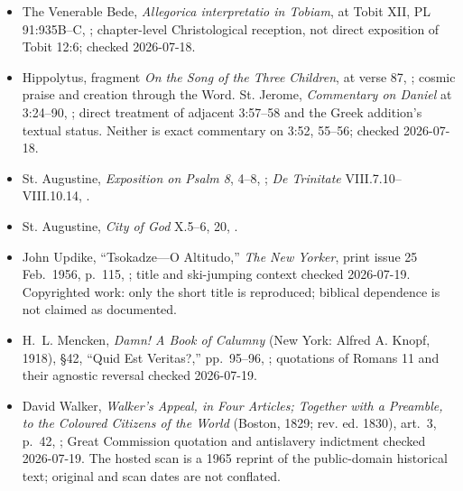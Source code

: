 {\begin{itemize}
\item The Venerable Bede, \emph{Allegorica interpretatio in Tobiam}, at Tobit XII, PL 91:935B--C, ; chapter-level Christological reception, not direct exposition of Tobit 12:6; checked 2026-07-18.
\item Hippolytus, fragment \emph{On the Song of the Three Children}, at verse 87, ; cosmic praise and creation through the Word. St. Jerome, \emph{Commentary on Daniel} at 3:24--90, ; direct treatment of adjacent 3:57--58 and the Greek addition's textual status. Neither is exact commentary on 3:52, 55--56; checked 2026-07-18.
\item St. Augustine, \emph{Exposition on Psalm 8}, 4--8, ; \emph{De Trinitate} VIII.7.10--VIII.10.14, .
\item St. Augustine, \emph{City of God} X.5--6, 20, .
\item John Updike, ``Tsokadze---O Altitudo,'' \emph{The New Yorker}, print issue 25 Feb.~1956, p.~115, ; title and ski-jumping context checked 2026-07-19. Copyrighted work: only the short title is reproduced; biblical dependence is not claimed as documented.
\item H.~L. Mencken, \emph{Damn! A Book of Calumny} (New York: Alfred A. Knopf, 1918), §42, ``Quid Est Veritas?,'' pp.~95--96, ; quotations of Romans 11 and their agnostic reversal checked 2026-07-19.
\item David Walker, \emph{Walker's Appeal, in Four Articles; Together with a Preamble, to the Coloured Citizens of the World} (Boston, 1829; rev. ed. 1830), art.~3, p.~42, ; Great Commission quotation and antislavery indictment checked 2026-07-19. The hosted scan is a 1965 reprint of the public-domain historical text; original and scan dates are not conflated.
\end{itemize}
}

